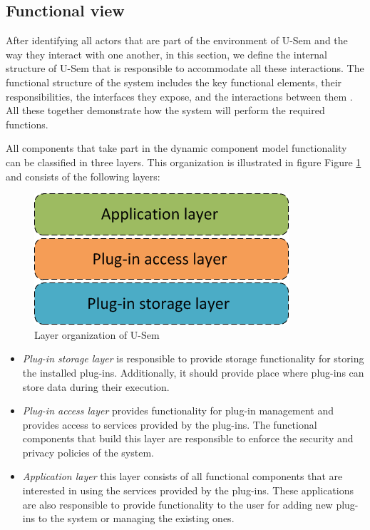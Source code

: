 \subsection{Functional view}

After identifying all actors that are part of the environment of U-Sem and the way they interact with one another, in this section, we define the internal structure of U-Sem that is responsible to accommodate all these interactions. The functional structure of the system includes the key functional elements, their responsibilities, the interfaces they expose, and the interactions between them \cite{rozanski2011software}. All these together demonstrate how the system will perform the required functions.

All components that take part in the dynamic component model functionality can be classified in three layers. This organization is illustrated in figure Figure \ref{fig_layer} and consists of the following layers:

\begin{figure}[h!]
  \centering
  	\includegraphics[scale=0.6]{plug-in/layers/layers.png}
  \caption{Layer organization of U-Sem}
  \label{fig_layer}
\end{figure}

\begin{itemize}
	\item \textit{Plug-in storage layer} is responsible to provide storage functionality for storing the installed plug-ins. Additionally, it should provide place where plug-ins can store data during their execution.
	\item \textit{Plug-in access layer} provides functionality for plug-in management and provides access to services provided by the plug-ins. The functional components that build this layer are responsible to enforce the security and privacy policies of the system.
	\item \textit{Application layer} this layer consists of all functional components that are interested in using the services provided by the plug-ins. These applications are also responsible to provide functionality to the user for adding new plug-ins to the system or managing the existing ones. 
	\end{itemize}


